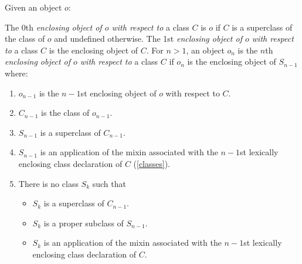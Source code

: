 \documentclass{article}
\begin{document}


Given an object $o$:

The
0th {\em enclosing object of $o$ with respect to} a class $C$ is $o$ if $C$ is a superclass of
the class of $o$ and undefined otherwise. 
The 1st {\em enclosing object of $o$ with respect to} a class $C$ is the enclosing object of $C$.
For $n > 1$, an object $o_n$ is the $n$th {\em enclosing object of $o$ with respect to} a class $C$ if $o_n$ is the enclosing object of $S_{n-1}$ where:
\begin{enumerate}
\item $o_{n-1}$ is the $n-1$st enclosing object of $o$ with respect to $C$.
\item $C_{n-1}$ is the class of $o_{n-1}$.
\item $S_{n-1}$ is a superclass of $C_{n-1}$.
\item $S_{n-1}$ is an application of the mixin associated with the $n-1$st lexically enclosing class declaration of $C$ (\ref{classes}).
\item There is no class $S_k$ such that
  \begin{itemize}
  \item $S_k$ is a superclass of $C_{n-1}$.
  \item $S_k$ is a proper subclass of $S_{n-1}$.
  \item $S_k$ is an application of the mixin associated with the $n-1$st lexically enclosing class declaration of $C$. %
  \end{itemize} 
\end{enumerate}
\end{document}
